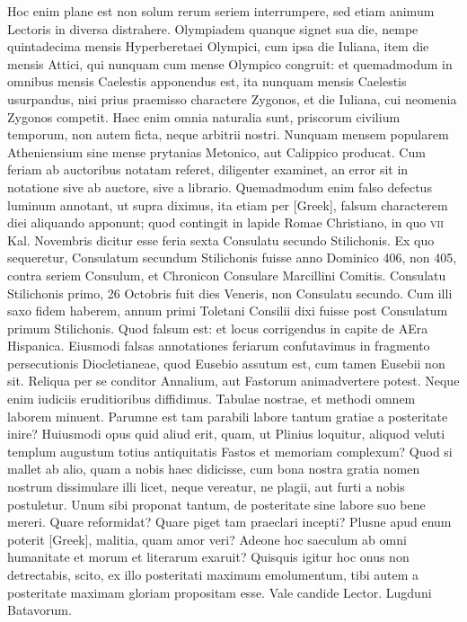 \begin{parnumbers}
{}
\lnr{}Hoc enim
plane est non solum rerum seriem interrumpere, sed etiam animum
Lectoris in diversa distrahere.
\lnr{}Olympiadem quanque signet sua die,
nempe quintadecima mensis Hyperberetaei Olympici, cum ipsa die
Iuliana, item die mensis Attici, qui nunquam cum mense Olympico
congruit: et quemadmodum in omnibus mensis Caelestis apponendus
est, ita nunquam mensis Caelestis usurpandus, nisi prius praemisso charactere
Zygonos, et die Iuliana, cui neomenia Zygonos competit.
\lnr{}Haec enim omnia naturalia sunt, priscorum civilium temporum, non
autem ficta, neque arbitrii nostri.
\lnr{}Nunquam mensem popularem Atheniensium
sine mense prytanias Metonico, aut Calippico producat.
\lnr{}Cum feriam ab auctoribus notatam referet, diligenter examinet, an
error sit in notatione sive ab auctore, sive a librario.
\lnr{}Quemadmodum
enim falso defectus luminum annotant, ut supra diximus, ita etiam
per \textgreek{[Greek]}, falsum characterem diei aliquando apponunt;
 quod contingit
in lapide Romae Christiano, in quo \textsc{vii} Kal. Novembris dicitur
esse feria sexta Consulatu secundo Stilichonis.
\lnr{}Ex quo sequeretur, Consulatum
secundum Stilichonis fuisse anno Dominico 406, non 405,
contra seriem Consulum, et Chronicon Consulare Marcillini Comitis.
\lnr{}Consulatu Stilichonis primo, 26 Octobris fuit dies Veneris,
non Consulatu secundo.
\lnr{}Cum illi saxo fidem haberem, annum primi
Toletani Consilii dixi fuisse post Consulatum primum Stilichonis.
\lnr{}Quod falsum est: et locus corrigendus in capite de AEra Hispanica.
\lnr{}Eiusmodi falsas annotationes feriarum confutavimus in fragmento
persecutionis Diocletianeae, quod Eusebio assutum est, cum tamen
Eusebii non sit.
\lnr{}Reliqua per se conditor Annalium, aut Fastorum animadvertere
potest.
\lnr{}Neque enim iudiciis eruditioribus diffidimus.
\lnr{}Tabulae nostrae, et methodi omnem laborem minuent.
\lnr{}Parumne est
tam parabili labore tantum gratiae a posteritate inire?
\lnr{}Huiusmodi
opus quid aliud erit, quam, ut Plinius loquitur, aliquod veluti templum
augustum totius antiquitatis Fastos et memoriam complexum?
\lnr{}Quod si mallet ab alio, quam a nobis haec didicisse, cum bona nostra
gratia nomen nostrum dissimulare illi licet, neque vereatur, ne
plagii, aut furti a nobis postuletur.
\lnr{}Unum sibi proponat tantum, de
posteritate sine labore suo bene mereri.
\lnr{}Quare reformidat?
\lnr{}Quare piget tam praeclari incepti?
\lnr{}Plusne apud enum poterit \textgreek{[Greek]}, malitia,
quam amor veri?
\lnr{}Adeone hoc saeculum ab omni humanitate et
morum et literarum exaruit?
\lnr{}Quisquis igitur hoc onus non detrectabis,
scito, ex illo posteritati maximum emolumentum, tibi autem
a posteritate maximam gloriam propositam esse.
\lnr{}Vale candide
Lector.
\lnr{}Lugduni Batavorum.

\end{parnumbers}
